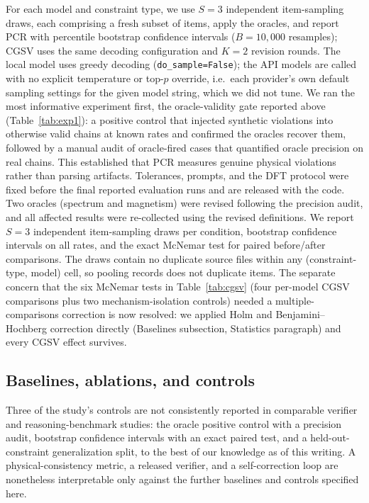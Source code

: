 \documentclass[pdflatex,sn-nature]{sn-jnl}
\begin{document}
For each model and constraint type, we use $S=3$ independent item-sampling
draws, each comprising a fresh subset of items, apply the oracles, and report
PCR with percentile bootstrap confidence intervals ($B=10{,}000$ resamples);
CGSV uses the same decoding configuration and $K=2$ revision rounds. The local model uses greedy decoding (\texttt{do\_sample=False}); the API models are called with no explicit temperature or top-$p$ override, i.e.\ each provider's own default sampling settings for the given model string, which we did not tune. We ran the most informative experiment first, the oracle-validity gate reported above (Table~\ref{tab:exp1}): a positive control that injected synthetic violations into otherwise valid chains at known rates and confirmed the oracles recover them, followed by a manual audit of oracle-fired cases that quantified oracle precision on real chains. This established that PCR measures genuine physical violations rather than parsing artifacts. Tolerances, prompts, and the DFT protocol were fixed before the final reported evaluation runs and are released with the code. Two oracles (spectrum and magnetism) were revised following the precision audit, and all affected results were re-collected using the revised definitions. We report $S=3$ independent item-sampling draws per condition, bootstrap
confidence intervals on all rates, and the exact McNemar test for paired
before/after comparisons. The draws contain no duplicate source files within
any (constraint-type, model) cell, so pooling records does not duplicate items. The separate concern that the six McNemar tests in Table~\ref{tab:cgsv} (four per-model CGSV comparisons plus two mechanism-isolation controls) needed a multiple-comparisons correction is now resolved: we applied Holm and Benjamini--Hochberg correction directly (Baselines subsection, Statistics paragraph) and every CGSV effect survives.

\subsection*{Baselines, ablations, and controls}
Three of the study's controls are not consistently reported in comparable
verifier and reasoning-benchmark studies: the oracle positive control with a
precision audit, bootstrap confidence intervals with an exact paired test, and a
held-out-constraint generalization split, to the best of our knowledge as of this
writing. A physical-consistency metric, a released verifier, and a
self-correction loop are nonetheless interpretable only against the further
baselines and controls specified here.
\end{document}
